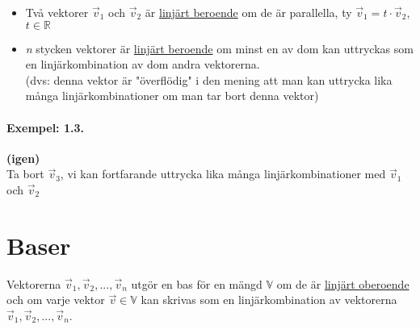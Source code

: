 \newpage
\begin{itemize}
	\item Två vektorer $\vec{v}_1$ och $\vec{v}_2$ är \underline{linjärt beroende} om de är parallella, ty $\vec{v}_1 = t \cdot \vec{v}_2$, $t \in \mathbb{R}$
	\item \textit{n} stycken vektorer är \underline{linjärt beroende} om minst en av dom kan uttryckas som en linjärkombination av dom andra vektorerna.\\
	(dvs: denna vektor är "överflödig" i den mening att man kan uttrycka lika många linjärkombinationer om man tar bort denna vektor)
\end{itemize}
\begin{mdframed}
\paragraph{Exempel: 1.3.} %
\label{par:ex_1_3_}
\textbf{(igen)}\\
Ta bort $\vec{v}_3$, vi kan fortfarande uttrycka lika många linjärkombinationer med $\vec{v}_1$ och $\vec{v}_2$
\end{mdframed}

\section{Baser} %
\label{sec:baser}
\begin{Def}
	Vektorerna $\vec{v}_1, \vec{v}_2,..., \vec{v}_n$ utgör en bas för en mängd $\mathbb{V}$ om de är \underline{linjärt oberoende} och om varje vektor $\vec{v} \in \mathbb{V}$ kan skrivas som en linjärkombination av vektorerna $\vec{v}_1, \vec{v}_2,..., \vec{v}_n$.
\end{Def}
